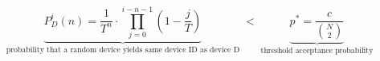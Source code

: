 \documentclass{standalone}
\begin{document}
\centering
\begin{minipage}{13cm}
	\[
		\underbrace{
			P_D^i(n)
			=
			\frac{1}{T^n}
			\cdot
			\prod_{j=0}^{i - n - 1}
			\left(1 - \frac{j}{T}\right)
		}_{\text{probability that a random device yields same device ID as device D}}
		\;<\;
		\underbrace{
			p^* = \frac{c}{\binom{N}{2}}
		}_{\text{threshold acceptance probability}}
	\]
\end{minipage}
\end{document}

